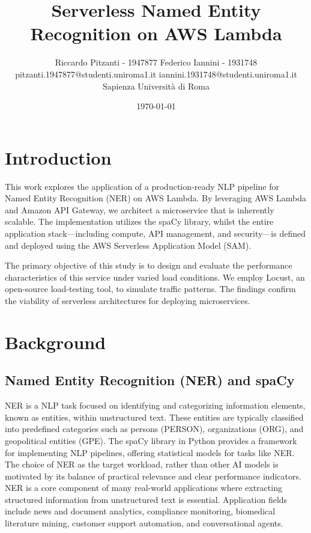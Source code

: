 \documentclass[11pt,a4paper]{article}
\title{\vspace{-1.5em}\Large\bfseries Serverless Named Entity Recognition on AWS Lambda}
\author{Riccardo Pitzanti - 1947877 \quad \quad \quad \quad Federico Iannini - 1931748\\
  \normalsize pitzanti.1947877@studenti.uniroma1.it \quad iannini.1931748@studenti.uniroma1.it\\[0.25em]
  \normalsize Sapienza Università di Roma}
\date{\normalsize \today}
\begin{document}
\maketitle
\vspace{-1.5em}

\section{Introduction}
This work explores the application of a production-ready NLP pipeline for Named Entity Recognition (NER) on AWS Lambda. By leveraging AWS Lambda and Amazon API Gateway, we architect a microservice that is inherently scalable. The implementation utilizes the spaCy library, whilst the entire application stack—including compute, API management, and security—is defined and deployed using the AWS Serverless Application Model (SAM).

The primary objective of this study is to design and evaluate the performance characteristics of this service under varied load conditions. We employ Locust, an open-source load-testing tool, to simulate traffic patterns. The findings confirm the viability of serverless architectures for deploying microservices.

\section{Background}

\subsection{Named Entity Recognition (NER) and spaCy}
NER is a NLP task focused on identifying and categorizing information elements, known as entities, within unstructured text. These entities are typically classified into predefined categories such as persons (\textsf{PERSON}), organizations (\textsf{ORG}), and geopolitical entities (\textsf{GPE}). The spaCy library in Python provides a framework for implementing NLP pipelines, offering statistical models for tasks like NER.
The choice of NER as the target workload, rather than other AI models is motivated by its balance of practical relevance and clear performance indicators. NER is a core component of many real-world applications where extracting structured information from unstructured text is essential. Application fields include news and document analytics, compliance monitoring, biomedical literature mining, customer support automation, and conversational agents.
\end{document}
